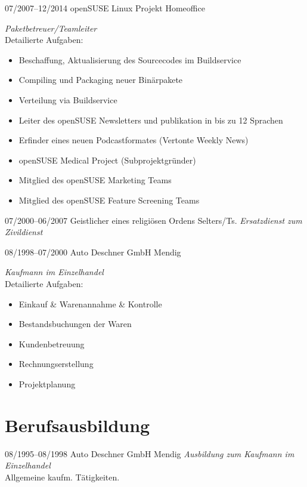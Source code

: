 \documentclass[a4paper]{friggeri-cv} %
\begin{document}
\begin{entrylist}
\entry
{07/2007--12/2014}
{openSUSE Linux Projekt}
{Homeoffice}
{\emph{Paketbetreuer/Teamleiter}\\
    Detailierte Aufgaben:
    \begin{itemize}
        \item Beschaffung, Aktualisierung des Sourcecodes im Buildservice
        \item Compiling und Packaging neuer Binärpakete
        \item Verteilung via Buildservice
        \item Leiter des openSUSE Newsletters und publikation in bis zu 12 Sprachen
        \item Erfinder eines neuen Podcastformates (Vertonte Weekly News)
        \item openSUSE Medical Project (Subprojektgründer)
        \item Mitglied des openSUSE Marketing Teams
        \item Mitglied des openSUSE Feature Screening Teams
    \end{itemize}
}
\entry
{07/2000--06/2007}
{Geistlicher eines religiösen Ordens}
{Selters/Ts.}
{\emph{Ersatzdienst zum Zivildienst}}
\end{entrylist}
\begin{entrylist}
\entry
{08/1998--07/2000}
{Auto Deschner GmbH}
{Mendig}
{\emph{Kaufmann im Einzelhandel}\\
    Detailierte Aufgaben:
    \begin{itemize}
        \item Einkauf \& Warenannahme \& Kontrolle
        \item Bestandsbuchungen der Waren
        \item Kundenbetreuung
        \item Rechnungserstellung
        \item Projektplanung
    \end{itemize}
}
\end{entrylist}

\section{Berufsausbildung}
\begin{entrylist}
\entry
{08/1995--08/1998}
{Auto Deschner GmbH}
{Mendig}
{\emph{Ausbildung zum Kaufmann im Einzelhandel}\\
Allgemeine kaufm. Tätigkeiten.
}
\end{entrylist}
\end{document}
